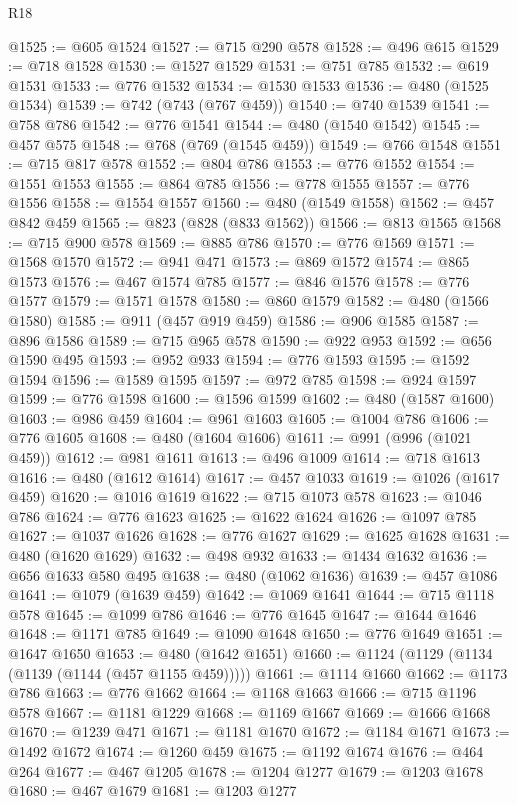 \begin{lexlean}{R18}
\begin{coremodule}
{{{{{{{{{{{{{{{{{{{{{{{{{{{{{{{{{{{{{{{{{{{{{{{{{{{{{{{{{{{{{{{{{{{{{{{{{{{{{{{{{{{{{{{{{{{{{{{{{{{{{{{{{{{{{@1525 := @605 @1524
@1527 := @715 @290 @578
@1528 := @496 @615
@1529 := @718 @1528
@1530 := @1527 @1529
@1531 := @751 @785
@1532 := @619 @1531
@1533 := @776 @1532
@1534 := @1530 @1533
@1536 := @480 (@1525 @1534)
@1539 := @742 (@743 (@767 @459))
@1540 := @740 @1539
@1541 := @758 @786
@1542 := @776 @1541
@1544 := @480 (@1540 @1542)
@1545 := @457 @575
@1548 := @768 (@769 (@1545 @459))
@1549 := @766 @1548
@1551 := @715 @817 @578
@1552 := @804 @786
@1553 := @776 @1552
@1554 := @1551 @1553
@1555 := @864 @785
@1556 := @778 @1555
@1557 := @776 @1556
@1558 := @1554 @1557
@1560 := @480 (@1549 @1558)
@1562 := @457 @842 @459
@1565 := @823 (@828 (@833 @1562))
@1566 := @813 @1565
@1568 := @715 @900 @578
@1569 := @885 @786
@1570 := @776 @1569
@1571 := @1568 @1570
@1572 := @941 @471
@1573 := @869 @1572
@1574 := @865 @1573
@1576 := @467 @1574 @785
@1577 := @846 @1576
@1578 := @776 @1577
@1579 := @1571 @1578
@1580 := @860 @1579
@1582 := @480 (@1566 @1580)
@1585 := @911 (@457 @919 @459)
@1586 := @906 @1585
@1587 := @896 @1586
@1589 := @715 @965 @578
@1590 := @922 @953
@1592 := @656 @1590 @495
@1593 := @952 @933
@1594 := @776 @1593
@1595 := @1592 @1594
@1596 := @1589 @1595
@1597 := @972 @785
@1598 := @924 @1597
@1599 := @776 @1598
@1600 := @1596 @1599
@1602 := @480 (@1587 @1600)
@1603 := @986 @459
@1604 := @961 @1603
@1605 := @1004 @786
@1606 := @776 @1605
@1608 := @480 (@1604 @1606)
@1611 := @991 (@996 (@1021 @459))
@1612 := @981 @1611
@1613 := @496 @1009
@1614 := @718 @1613
@1616 := @480 (@1612 @1614)
@1617 := @457 @1033
@1619 := @1026 (@1617 @459)
@1620 := @1016 @1619
@1622 := @715 @1073 @578
@1623 := @1046 @786
@1624 := @776 @1623
@1625 := @1622 @1624
@1626 := @1097 @785
@1627 := @1037 @1626
@1628 := @776 @1627
@1629 := @1625 @1628
@1631 := @480 (@1620 @1629)
@1632 := @498 @932
@1633 := @1434 @1632
@1636 := @656 @1633 @580 @495
@1638 := @480 (@1062 @1636)
@1639 := @457 @1086
@1641 := @1079 (@1639 @459)
@1642 := @1069 @1641
@1644 := @715 @1118 @578
@1645 := @1099 @786
@1646 := @776 @1645
@1647 := @1644 @1646
@1648 := @1171 @785
@1649 := @1090 @1648
@1650 := @776 @1649
@1651 := @1647 @1650
@1653 := @480 (@1642 @1651)
@1660 := @1124 (@1129 (@1134 (@1139 (@1144 (@457 @1155 @459)))))
@1661 := @1114 @1660
@1662 := @1173 @786
@1663 := @776 @1662
@1664 := @1168 @1663
@1666 := @715 @1196 @578
@1667 := @1181 @1229
@1668 := @1169 @1667
@1669 := @1666 @1668
@1670 := @1239 @471
@1671 := @1181 @1670
@1672 := @1184 @1671
@1673 := @1492 @1672
@1674 := @1260 @459
@1675 := @1192 @1674
@1676 := @464 @264
@1677 := @467 @1205
@1678 := @1204 @1277
@1679 := @1203 @1678
@1680 := @467 @1679
@1681 := @1203 @1277
}}}}}}}}}}}}}}}}}}}}}}}}}}}}}}}}}}}}}}}}}}}}}}}}}}}}}}}}}}}}}}}}}}}}}}}}}}}}}}}}}}}}}}}}}}}}}}}}}}}}}}}}}}}}}
\end{coremodule}
\end{lexlean}
